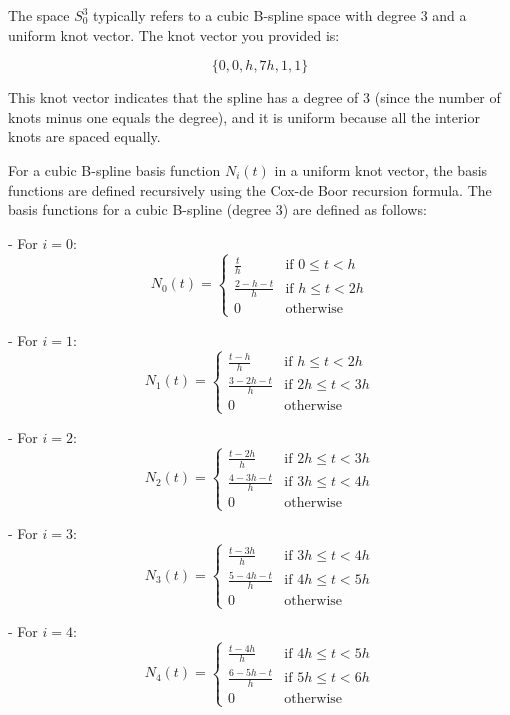 The space \(S^3_0\) typically refers to a cubic B-spline space with degree 3 and a uniform knot vector. The knot vector you provided is:

\[ \{0, 0, h, 7h, 1, 1\} \]

This knot vector indicates that the spline has a degree of 3 (since the number of knots minus one equals the degree), and it is uniform because all the interior knots are spaced equally.

For a cubic B-spline basis function \(N_i(t)\) in a uniform knot vector, the basis functions are defined recursively using the Cox-de Boor recursion formula. The basis functions for a cubic B-spline (degree 3) are defined as follows:

- For \(i = 0\):
  \[ N_{0}(t) = \begin{cases} 
  	\frac{t}{h} & \text{if } 0 \leq t < h \\
  	\frac{2-h-t}{h} & \text{if } h \leq t < 2h \\
  	0 & \text{otherwise}
  	\end{cases} \]

- For \(i = 1\):
  \[ N_{1}(t) = \begin{cases} 
  	\frac{t-h}{h} & \text{if } h \leq t < 2h \\
  	\frac{3-2h-t}{h} & \text{if } 2h \leq t < 3h \\
  	0 & \text{otherwise}
  	\end{cases} \]

- For \(i = 2\):
  \[ N_{2}(t) = \begin{cases} 
  	\frac{t-2h}{h} & \text{if } 2h \leq t < 3h \\
  	\frac{4-3h-t}{h} & \text{if } 3h \leq t < 4h \\
  	0 & \text{otherwise}
  	\end{cases} \]

- For \(i = 3\):
  \[ N_{3}(t) = \begin{cases} 
  	\frac{t-3h}{h} & \text{if } 3h \leq t < 4h \\
  	\frac{5-4h-t}{h} & \text{if } 4h \leq t < 5h \\
  	0 & \text{otherwise}
  	\end{cases} \]

- For \(i = 4\):
  \[ N_{4}(t) = \begin{cases} 
  	\frac{t-4h}{h} & \text{if } 4h \leq t < 5h \\
  	\frac{6-5h-t}{h} & \text{if } 5h \leq t < 6h \\
  	0 & \text{otherwise}
  	\end{cases} \]

